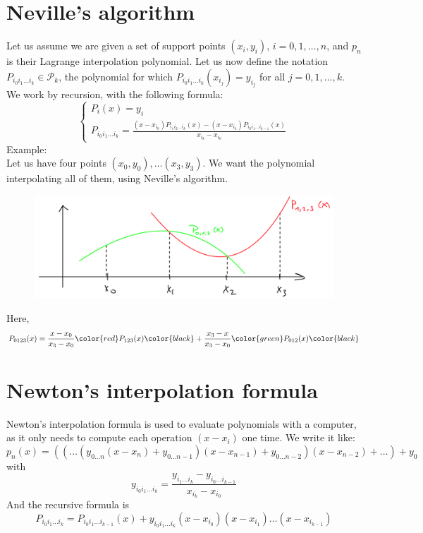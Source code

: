 \documentclass[12pt, openany]{report}
\theoremstyle{definition}
\begin{document}
\section{Neville's algorithm}
Let us assume we are given a set of support points \((x_i,y_i)\), \(i=0,1,\dots,n\), and \(p_n\) is their Lagrange interpolation polynomial. Let us now define the notation \(P_{i_0i_1\dots i_k}\in \mathcal{P}_k\), the polynomial for which \(P_{i_0i_1\dots i_k}(x_{i_j})=y_{i_j}\)  for all \(j=0,1,\dots,k\). We work by recursion, with the following formula:
\begin{equation}
    \begin{cases}
        P_i(x) = y_i\\
        P_{i_0i_1\dots i_k} = \frac{(x-x_{i_0})P_{i_1i_2\dots i_k}(x) - (x-x_{i_k})P_{i_0i_1\dots i_{k-1}}(x)}{x_{i_k}-x_{i_0}}
    \end{cases}
\end{equation}
Example:\\
Let us have four points \((x_0,y_0),\dots(x_3,y_3)\). We want the polynomial interpolating all of them, using Neville's algorithm. 
\begin{figure}[H]
    \centering
    \includegraphics[width=0.5\linewidth]{img/neville.png}
\end{figure}
Here, 
\begin{equation}
    P_{0123}(x) = \frac{x-x_0}{x_3-x_0}\color{red}P_{123}(x)\color{black}+\frac{x_3-x}{x_3-x_0}\color{green}P_{012}(x)\color{black}
\end{equation}
\section{Newton's interpolation formula}
Newton's interpolation formula is used to evaluate polynomials with a computer, as it only needs to compute each operation \((x-x_i)\) one time. We write it like:
\begin{equation}
    p_n(x) = \left(\left(\dots\left(y_{0\dots n}(x-x_n)+y_{0\dots n-1}\right)(x-x_{n-1})+y_{0\dots n-2}\right)(x-x_{n-2})+\dots\right) + y_0
\end{equation}
with
\begin{equation}
    y_{i_0i_1\dots i_k} = \frac{y_{i_1\dots i_{k}}-y_{i_0\dots i_{k-1}}}{x_{i_k}-x_{i_0}}
\end{equation}
And the recursive formula is
\begin{equation}
    P_{i_0i_1\dots i_k}= P_{i_0i_1\dots i_{k-1}}(x) + y_{i_0i_1\dots i_k}(x-x_{i_0})(x-x_{i_1})\dots(x-x_{i_{k-1}})
\end{equation}
\end{document}
